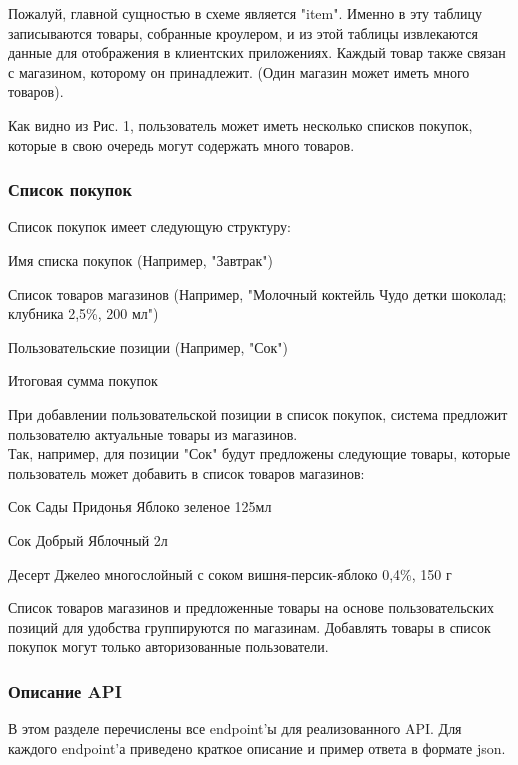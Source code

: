 Пожалуй, главной сущностью в схеме является "item". Именно в эту таблицу
записываются товары, собранные кроулером, и из этой таблицы извлекаются данные
для отображения в клиентских приложениях. Каждый товар также связан с
магазином, которому он принадлежит. (Один магазин может иметь много товаров).

Как видно из Рис. 1, пользователь может иметь несколько списков покупок,
которые в свою очередь могут содержать много товаров.

\subsubsection{Список покупок}
Список покупок имеет следующую структуру:
\begin{my_enumerate}
  \item Имя списка покупок (Например, "Завтрак")
  \item Список товаров магазинов (Например, "Молочный коктейль Чудо детки
    шоколад; клубника 2,5\%, 200 мл")
  \item Пользовательские позиции (Например, "Сок")
  \item Итоговая сумма покупок
\end{my_enumerate}

При добавлении пользовательской позиции в список покупок, система предложит
пользователю актуальные товары из магазинов.\\
Так, например, для позиции "Сок" будут предложены следующие товары, 
которые пользователь может добавить в список товаров магазинов:
\begin{my_enumerate}
\item Сок Сады Придонья Яблоко зеленое 125мл
\item Сок Добрый Яблочный 2л
\item Десерт Джелео многослойный с соком вишня-персик-яблоко 0,4\%, 150 г
\end{my_enumerate}

Список товаров магазинов и предложенные товары на основе пользовательских
позиций для удобства группируются по магазинам.
Добавлять товары в список покупок могут только авторизованные пользователи.


\subsubsection{Описание API}
В этом разделе перечислены все endpoint'ы для реализованного API.
Для каждого endpoint'а приведено краткое описание и пример ответа в формате
json.


